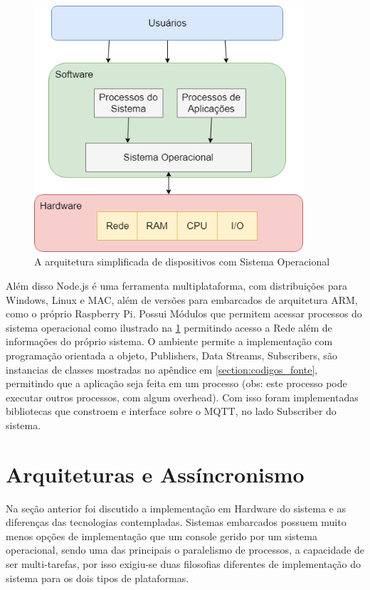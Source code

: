 \begin{figure}[h!]
\centering
\includegraphics[width=10cm]{./02_Capitulos/02_Cap3/figures/os-diagram}
\caption{A arquitetura simplificada de dispositivos com Sistema Operacional}
\label{fig:3.3.4/os-diagram}
\end{figure}


Além disso Node.js é uma ferramenta multiplataforma, com distribuições para Windows, Linux e MAC, além de versões para embarcados de arquitetura ARM, como o próprio Raspberry Pi. Possui Módulos que permitem acessar processos do sistema operacional como ilustrado na \ref{fig:3.3.4/os-diagram} permitindo acesso a Rede além de informações do próprio sistema. O ambiente permite a implementação com programação orientada a objeto, Publishers, Data Streams, Subscribers, são instancias de classes mostradas no apêndice em \ref{section:codigos_fonte}, permitindo que a aplicação seja feita em um processo (obs: este processo pode executar outros processos, com algum overhead).  Com isso foram implementadas bibliotecas que constroem e interface sobre o MQTT, no lado Subscriber do sistema.

\section{Arquiteturas e Assíncronismo}
\label{section:arquitetura}

Na seção anterior foi discutido a implementação em Hardware do sistema e as diferenças das tecnologias contempladas. Sistemas embarcados 
possuem muito menos opções de implementação que um console gerido por um sistema operacional, sendo uma das principais o paralelismo de processos, a capacidade de ser multi-tarefas, por isso exigiu-se duas filosofias diferentes de implementação do sistema para os dois tipos de plataformas.

